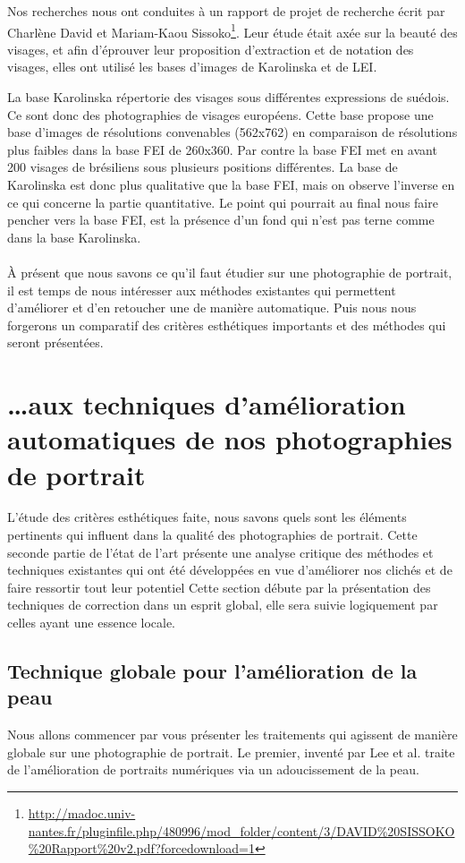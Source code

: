 \documentclass[11pt, french,screen]{report-rd-info}
\begin{document}
Nos recherches nous ont conduites à un rapport de projet de recherche écrit par Charlène David et Mariam-Kaou Sissoko\footnote{\url{http://madoc.univ-nantes.fr/pluginfile.php/480996/mod_folder/content/3/DAVID\%20SISSOKO\%20Rapport\%20v2.pdf?forcedownload=1}}. Leur étude était axée sur la beauté des visages, et afin d'éprouver leur proposition d'extraction et de notation des visages, elles ont utilisé les bases d'images de Karolinska et de LEI.

La base Karolinska répertorie des visages sous différentes expressions de suédois. Ce sont donc des photographies de visages européens. Cette base propose une base d'images de résolutions convenables (562x762) en comparaison de résolutions plus faibles dans la base FEI de 260x360. Par contre la base FEI met en avant 200 visages de brésiliens sous plusieurs positions différentes. La base de Karolinska est donc plus qualitative que la base FEI, mais on observe l'inverse en ce qui concerne la partie quantitative. Le point qui pourrait au final nous faire pencher vers la base FEI, est la présence d'un fond qui n'est pas terne comme dans la base Karolinska.
\paragraph*{}
À présent que nous savons ce qu'il faut étudier sur une photographie de portrait, il est temps de nous intéresser aux méthodes existantes qui permettent d'améliorer et d’en retoucher une de manière automatique. Puis nous nous forgerons un comparatif des critères esthétiques importants et des méthodes qui seront présentées.

\section{\ldots aux techniques d’amélioration automatiques de nos photographies de portrait}
L’étude des critères esthétiques faite, nous savons quels sont les éléments pertinents qui influent dans la qualité des photographies de portrait. Cette seconde partie de l’état de l’art présente une analyse critique des méthodes et techniques existantes qui ont été développées en vue d’améliorer nos clichés et de faire ressortir tout leur potentiel
Cette section débute par la présentation des techniques de correction dans un esprit global, elle sera suivie logiquement par celles ayant une essence locale.
\subsection{Technique globale pour l’amélioration de la peau}
Nous allons commencer par vous présenter les traitements qui agissent de manière globale sur une photographie de portrait. Le premier, inventé par Lee et al. \cite{Lee} traite de l'amélioration de portraits numériques via un adoucissement de la peau.
\end{document}
